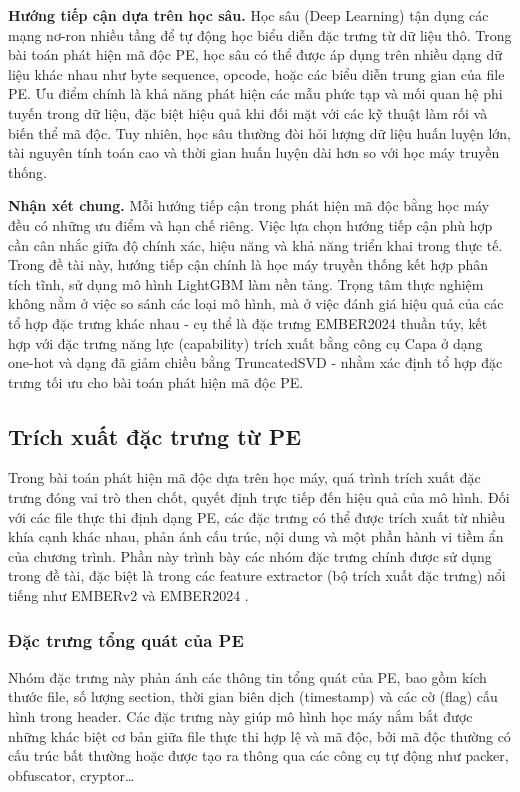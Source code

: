 \textbf{Hướng tiếp cận dựa trên học sâu.}
Học sâu (Deep Learning) tận dụng các mạng nơ-ron nhiều tầng để tự
động học biểu diễn đặc trưng từ dữ liệu thô. Trong bài toán phát hiện
mã độc PE, học sâu có thể được áp dụng trên nhiều dạng dữ liệu khác
nhau như byte sequence, opcode, hoặc các biểu diễn trung gian của file
PE. Ưu điểm chính là khả năng phát hiện các mẫu phức tạp và mối quan
hệ phi tuyến trong dữ liệu, đặc biệt hiệu quả khi đối mặt với các kỹ
thuật làm rối và biến thể mã độc. Tuy nhiên, học sâu thường đòi hỏi
lượng dữ liệu huấn luyện lớn, tài nguyên tính toán cao và thời gian
huấn luyện dài hơn so với học máy truyền thống.

\textbf{Nhận xét chung.}
Mỗi hướng tiếp cận trong phát hiện mã độc bằng học máy đều có những
ưu điểm và hạn chế riêng. Việc lựa chọn hướng tiếp cận phù hợp cần
cân nhắc giữa độ chính xác, hiệu năng và khả năng triển khai trong
thực tế. Trong đề tài này, hướng tiếp cận chính là học máy truyền
thống kết hợp phân tích tĩnh, sử dụng mô hình LightGBM làm nền tảng.
Trọng tâm thực nghiệm không nằm ở việc so sánh các loại mô hình, mà
ở việc đánh giá hiệu quả của các tổ hợp đặc trưng khác nhau - cụ
thể là đặc trưng EMBER2024 thuần túy, kết hợp với đặc trưng năng lực
(capability) trích xuất bằng công cụ Capa ở dạng one-hot và dạng đã
giảm chiều bằng TruncatedSVD - nhằm xác định tổ hợp đặc trưng tối
ưu cho bài toán phát hiện mã độc PE.






\subsection{Trích xuất đặc trưng từ PE}

Trong bài toán phát hiện mã độc dựa trên học máy, quá trình trích xuất
đặc trưng đóng vai trò then chốt, quyết định trực tiếp đến hiệu quả
của mô hình. Đối với các file thực thi định dạng PE, các đặc trưng có
thể được trích xuất từ nhiều khía cạnh khác nhau, phản ánh cấu trúc,
nội dung và một phần hành vi tiềm ẩn của chương trình. Phần này trình
bày các nhóm đặc trưng chính được sử dụng trong đề tài, đặc biệt là
trong các feature extractor (bộ trích xuất đặc trưng) nổi tiếng như EMBERv2 và EMBER2024
\cite{ember2024benchmark}.

\subsubsection{Đặc trưng tổng quát của PE}

Nhóm đặc trưng này phản ánh các thông tin tổng quát của PE, bao
gồm kích thước file, số lượng section, thời gian biên dịch (timestamp) và các cờ
(flag) cấu hình trong header. Các đặc trưng này giúp mô hình học máy
nắm bắt được những khác biệt cơ bản giữa file thực thi hợp lệ và mã
độc, bởi mã độc thường có cấu trúc bất thường hoặc được tạo ra thông
qua các công cụ tự động như packer, obfuscator, cryptor\dots

